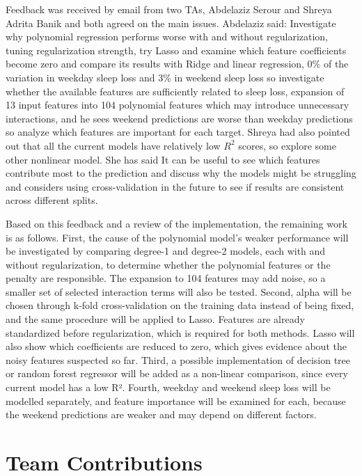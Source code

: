 \documentclass[11pt]{article}
\begin{document}
Feedback was received by email from two TAs, Abdelaziz Serour and Shreya Adrita Banik and both agreed on the main issues. Abdelaziz said: Investigate why polynomial regression performs worse with and without regularization, tuning regularization strength, try Lasso and examine which feature coefficients become zero and compare its results with Ridge and linear regression, 0\% of the variation in weekday sleep loss and 3\% in weekend sleep loss so investigate whether the available features are sufficiently related to sleep loss, expansion of 13 input features into 104 polynomial features which may introduce unnecessary interactions, and he sees weekend predictions are worse than weekday predictions so analyze which features are important for each target. Shreya had also pointed out that all the current models have relatively low $R^2$ scores, so explore some other nonlinear model. She has said It can be useful to see which features contribute most to the prediction and discuss why the models might be struggling and considers using  cross-validation in the future to see if results are consistent across different splits. 
 
Based on this feedback and a review of the implementation, the remaining work is as follows. First, the cause of the polynomial model’s weaker performance will be investigated by comparing degree-1 and degree-2 models, each with and without regularization, to determine whether the polynomial features or the penalty are responsible. The expansion to 104 features may add noise, so a smaller set of selected interaction terms will also be tested. Second, alpha will be chosen through k-fold cross-validation on the training data instead of being fixed, and the same procedure will be applied to Lasso. Features are already standardized before regularization, which is required for both methods. Lasso will also show which coefficients are reduced to zero, which gives evidence about the noisy features suspected so far. Third, a possible implementation of decision tree or random forest regressor will be added as a non-linear comparison, since every current model has a low R². Fourth, weekday and weekend sleep loss will be modelled separately, and feature importance will be examined for each, because the weekend predictions are weaker and may depend on different factors. 

\section*{Team Contributions}
\end{document}
